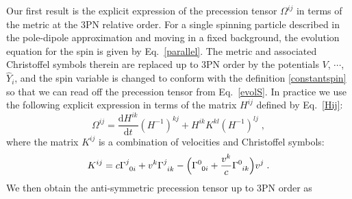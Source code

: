 \documentclass[
superscriptaddress,
preprint,
prd,tightenlines,showpacs,nofootinbib,
eqsecnum,
amsfonts,amsmath,amssymb]{revtex4-1}
\newcommand{\ud}{\mathrm{d}}
\newcommand{\ph}[1]{\phantom{#1}}
\begin{document}
Our first result is the explicit expression of the precession tensor
$\Omega^{ij}$ in terms of the metric at the 3PN relative order.  For a
single spinning particle described in the pole-dipole approximation
and moving in a fixed background, the evolution equation for the spin
is given by Eq.~\eqref{parallel}. The metric and associated
Christoffel symbols therein are replaced up to 3PN order by the
potentials $V$, $\cdots$, $\hat{Y}_i$, and the spin variable is
changed to conform with the definition \eqref{constantspin} so that we
can read off the precession tensor from Eq.~\eqref{evolS}. In practice
we use the following explicit expression in terms of the matrix
$H^{ij}$ defined by Eq.~\eqref{Hij}:
%
\begin{equation}\label{eq:DefAij}
  \Omega^{ij} = 
\frac{\ud H^{ik}}{\ud t} (H^{-1})^{kj} + H^{ik}K^{kl}(H^{-1})^{lj} \;,
\end{equation}
%
where the matrix $K^{ij}$ is a combination of velocities and
Christoffel symbols:
%
\begin{equation}\label{eq:DefBij}
	K^{ij} = 
c \Gamma^{j}_{\ph{j}0i} + v^{k}\Gamma^{j}_{\ph{j}ik} - 
\Bigl( \Gamma^{0}_{\ph{0}0i} + \frac{v^{k}}{c}\Gamma^{0}_{\ph{0}ik} \Bigr)v^{j} \; .
\end{equation}
%
We then obtain the anti-symmetric precession tensor up to 3PN order as
%
\end{document}
